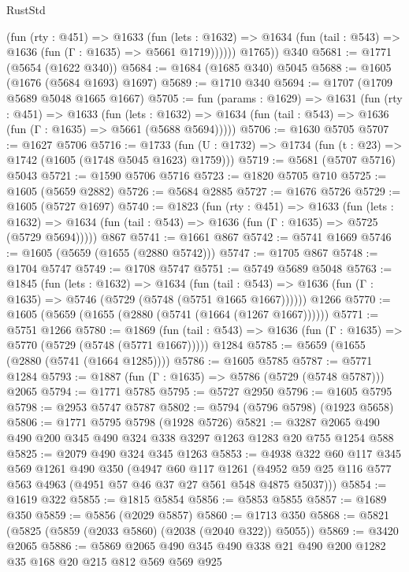 \begin{lexlean}{RustStd}
\begin{coremodule}
            (fun (rty : @451) =>
            @1633
              (fun (lets : @1632) =>
              @1634 (fun (tail : @543) => @1636 (fun (Γ : @1635) => @5661 @1719))))))
        @1765))
    @340
@5681 := @1771 (@5654 (@1622 @340))
@5684 := @1684 (@1685 @340) @5045
@5688 := @1605 (@1676 (@5684 @1693) @1697)
@5689 := @1710 @340
@5694 := @1707 (@1709 @5689 @5048 @1665 @1667)
@5705 := fun (params : @1629) =>
  @1631
    (fun (rty : @451) =>
    @1633
      (fun (lets : @1632) =>
      @1634 (fun (tail : @543) => @1636 (fun (Γ : @1635) => @5661 (@5688 @5694)))))
@5706 := @1630 @5705
@5707 := @1627 @5706
@5716 := @1733 (fun (U : @1732) => @1734 (fun (t : @23) => @1742 (@1605 (@1748 @5045 @1623) @1759)))
@5719 := @5681 (@5707 @5716) @5043
@5721 := @1590 @5706 @5716
@5723 := @1820 @5705 @710
@5725 := @1605 (@5659 @2882)
@5726 := @5684 @2885
@5727 := @1676 @5726
@5729 := @1605 (@5727 @1697)
@5740 := @1823
    (fun (rty : @451) =>
    @1633
      (fun (lets : @1632) =>
      @1634 (fun (tail : @543) => @1636 (fun (Γ : @1635) => @5725 (@5729 @5694)))))
    @867
@5741 := @1661 @867
@5742 := @5741 @1669
@5746 := @1605 (@5659 (@1655 (@2880 @5742)))
@5747 := @1705 @867
@5748 := @1704 @5747
@5749 := @1708 @5747
@5751 := @5749 @5689 @5048
@5763 := @1845
    (fun (lets : @1632) =>
    @1634
      (fun (tail : @543) => @1636 (fun (Γ : @1635) => @5746 (@5729 (@5748 (@5751 @1665 @1667))))))
    @1266
@5770 := @1605 (@5659 (@1655 (@2880 (@5741 (@1664 (@1267 @1667))))))
@5771 := @5751 @1266
@5780 := @1869
    (fun (tail : @543) => @1636 (fun (Γ : @1635) => @5770 (@5729 (@5748 (@5771 @1667)))))
    @1284
@5785 := @5659 (@1655 (@2880 (@5741 (@1664 @1285))))
@5786 := @1605 @5785
@5787 := @5771 @1284
@5793 := @1887 (fun (Γ : @1635) => @5786 (@5729 (@5748 @5787))) @2065
@5794 := @1771 @5785
@5795 := @5727 @2950
@5796 := @1605 @5795
@5798 := @2953 @5747 @5787
@5802 := @5794 (@5796 @5798) (@1923 @5658)
@5806 := @1771 @5795 @5798 (@1928 @5726)
@5821 := @3287 @2065 @490 @490 @200 @345 @490 @324 @338 @3297 @1263 @1283 @20 @755 @1254 @588
@5825 := @2079 @490 @324 @345 @1263
@5853 := @4938
    @322
    @60
    @117
    @345
    @569
    @1261
    @490
    @350
    (@4947
      @60
      @117
      @1261
      (@4952 @59 @25 @116 @577 @563 @4963 (@4951 @57 @46 @37 @27 @561 @548 @4875 @5037)))
@5854 := @1619 @322
@5855 := @1815 @5854
@5856 := @5853 @5855
@5857 := @1689 @350
@5859 := @5856 (@2029 @5857)
@5860 := @1713 @350
@5868 := @5821 (@5825 (@5859 (@2033 @5860) (@2038 (@2040 @322)) @5055))
@5869 := @3420 @2065
@5886 := @5869 @2065 @490 @345 @490 @338 @21 @490 @200 @1282 @35 @168 @20 @215 @812 @569 @569 @925

\end{coremodule}
\end{lexlean}
